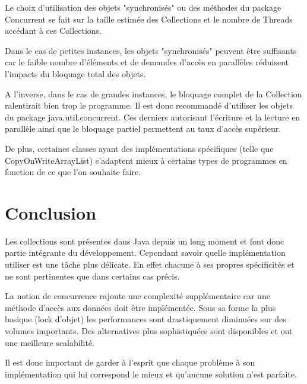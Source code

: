 \documentclass{report}
\begin{document}
		Le choix d'utilisation des objets "synchronisés" ou des méthodes du package Concurrent se fait sur la taille estimée des Collections et le nombre de Threads accédant à ces Collections.
		
		Dans le cas de petites instances, les objets "synchronisés" peuvent être suffisants car le faible nombre d'éléments et de demandes d'accès en parallèles réduisent l'impacts du bloquage total des objets.
		
		A l'inverse, dans le cas de grandes instances, le bloquage complet de la Collection ralentirait bien trop le programme. Il est donc recommandé d'utiliser les objets du package java.util.concurrent.
		Ces derniers autorisant l'écriture et la lecture en parallèle ainsi que le bloquage partiel permettent au taux d'accès supérieur.

		De plus, certaines classes ayant des implémentations spécifiques (telle que CopyOnWriteArrayList) s'adaptent mieux à certains types de programmes en fonction de ce que l'on souhaite faire.

	\chapter{Conclusion}
		Les collections sont présentes dans Java depuis un long moment et font donc partie intégrante du développement.
		Cependant savoir quelle implémentation utiliser est une tâche plus délicate.
		En effet chacune à ses propres spécificités et ne sont pertinentes que dans certains cas précis.

		La notion de concurrence rajoute une complexité supplémentaire car une méthode d'accès aux données doit être implémentée.
		Sous sa forme la plus basique (lock d'objet) les performances sont drastiquement diminuées sur des volumes importants.
		Des alternatives plus sophistiquées sont disponibles et ont une meilleure scalabilité.

		Il est donc important de garder à l'esprit que chaque problème à son implémentation qui lui correspond le mieux et qu'aucune solution n'est parfaite.
\end{document}
